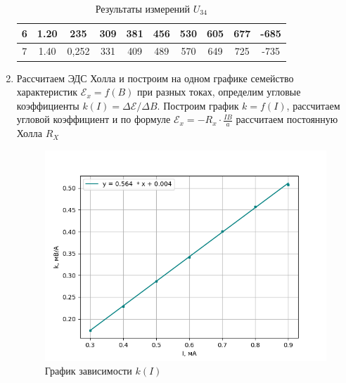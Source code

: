 \documentclass[12pt,a4paper]{article}
\begin{document}
\begin{enumerate}
\begin{table}[]
\begin{tabular}{|c|cccccccc|c|}
6     & \multicolumn{1}{c|}{1.20}       & \multicolumn{1}{c|}{235}          & \multicolumn{1}{c|}{309}            & \multicolumn{1}{c|}{381}           & \multicolumn{1}{c|}{456}            & \multicolumn{1}{c|}{530}           & \multicolumn{1}{c|}{605}           & 677             & -685            \\ \hline
7     & \multicolumn{1}{c|}{1.40}       & \multicolumn{1}{c|}{0,252}        & \multicolumn{1}{c|}{331}            & \multicolumn{1}{c|}{409}           & \multicolumn{1}{c|}{489}            & \multicolumn{1}{c|}{570}           & \multicolumn{1}{c|}{649}           & 725             & -735            \\ \hline
\end{tabular}
\caption{Результаты измерений $ U_{34} $}
\end{table}


  
 \item Рассчитаем ЭДС Холла и построим на одном графике семейство характеристик $\mathcal{E}_x=f(B)$ при разных токах, определим угловые коэффициенты $k(I)=\Delta \mathcal{E}/ \Delta B$. Построим график $k = f(I)$, рассчитаем угловой коэффициент и по формуле $\mathcal{E}_x= -R_x \cdot \frac{IB}{a}$ рассчитаем постоянную Холла $R_X$\\ 


   \begin{figure}[h!]
	\centering
	\includegraphics[scale=0.7]{334graph3.png}
        \caption{График зависимости $k(I)$}
\end{figure}




\end{enumerate}
\end{document}
